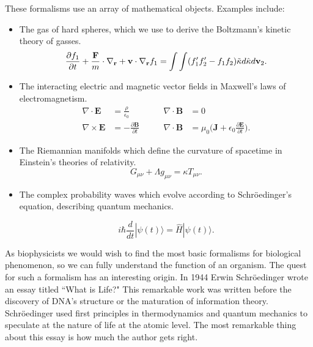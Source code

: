 
These formalisms use an array of mathematical objects. Examples include:
\begin{itemize}
\item The gas of hard spheres, which we use to derive the Boltzmann's kinetic theory of gasses.  
\begin{equation}
	\label{hard_spheres}
	\frac{\partial f_1}{\partial t} + \frac{\bold{F}}{m}\cdot\nabla_\bold{r} + \bold{v} \cdot \nabla_\bold{r} f_1 =  \int \int (f'_1f'_2 - f_1 f_2) \tilde \kappa d \hat \kappa d \bold{v}_2.
\end{equation}

\item The interacting electric and magnetic vector fields in Maxwell's laws of electromagnetism.
\begin{equation}
	\begin{aligned}
		\nabla \cdot  \mathbf{E} &= \frac{\rho}{\epsilon_0} \qquad & \nabla \cdot  \mathbf{B} &= 0 \\
		\nabla \times  \mathbf{E} &= -\frac{\partial \mathbf{B}}{\partial t} \qquad &  \nabla \cdot  \mathbf{B} &= \mu_0 \big(\mathbf{J} + \epsilon_0 \frac{\partial \mathbf{E} } {\partial t }\big).
	\end{aligned}
\end{equation}

\item The Riemannian manifolds which define the curvature of spacetime in Einstein's theories of relativity.
\begin{equation}
	G_{\mu \nu} + \Lambda g_{\mu \nu} = \kappa T_{\mu \nu}.
\end{equation}

\item The complex probability waves which evolve according to Schr\"oedinger's equation, describing quantum mechanics. 

\begin{equation}
	i \hbar \frac{d}{dt} | \psi (t) \rangle = \hat {H} | \psi (t) \rangle .
\end{equation}
\end{itemize}

As biophysicists we would wish to find the most basic formalisms for biological phenomenon, so we can fully understand the function of an organism. The quest for such a formalism has an interesting origin. In 1944 Erwin Schr\"oedinger wrote an essay titled ``What is Life?" This remarkable work was written before the discovery of DNA's structure or the maturation of information theory. Schr\"oedinger used first principles in thermodynamics and quantum mechanics to speculate at the nature of life at the atomic level. The most remarkable thing about this essay is how much the author gets right. 

